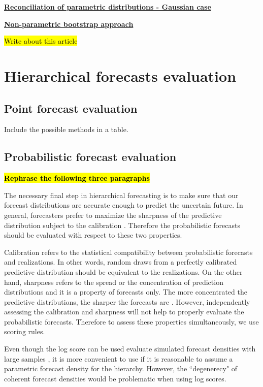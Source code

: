 \documentclass[graybox]{svmult}
\begin{document}
\newpage
\underline{\textbf{Reconciliation of parametric distributions - Gaussian case}}

\underline{\textbf{Non-parametric bootstrap approach}}

\textcolor{red}{\hl{Write about this article}} \cite{Jeon2018}


\section{Hierarchical forecasts evaluation}

\subsection{Point forecast evaluation}

Include the possible methods in a table. 

\subsection{Probabilistic forecast evaluation}

\textcolor{red} {\textbf{\hl{Rephrase the following three paragraphs}}}

The necessary final step in hierarchical forecasting is to make sure that our forecast distributions are accurate enough to predict the uncertain future. In general, forecasters prefer to maximize the sharpness of the predictive distribution subject to the calibration \cite{Gneiting2014}. Therefore the probabilistic forecasts should be evaluated with respect to these two properties.

Calibration refers to the statistical compatibility between probabilistic forecasts and realizations. In other words, random draws from a perfectly calibrated predictive distribution should be equivalent to the realizations. On the other hand, sharpness refers to the spread or the concentration of prediction distributions and it is a property of forecasts only. The more concentrated the predictive distributions, the sharper the forecasts are \cite{gneiting2008}. However, independently assessing the calibration and sharpness will not help to properly evaluate the probabilistic forecasts. Therefore to assess these properties simultaneously, we use scoring rules.




Even though the log score can be used evaluate simulated forecast densities with large samples \cite{Jordan2017}, it is more convenient to use if it is reasonable to assume a parametric forecast density for the hierarchy. However, the ``degenerecy" of coherent forecast densities would be problematic when using log scores.
\end{document}

